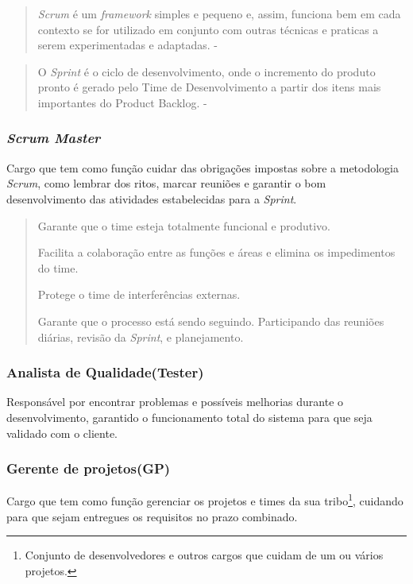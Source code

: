 \begin{quote}
  \textit{Scrum} é um \textit{framework} simples e pequeno e, assim, funciona bem em  cada contexto se for utilizado em conjunto com outras técnicas e praticas a serem experimentadas e adaptadas. - \cite{sabbagh2014scrum}
\end{quote}
\begin{quote}
  O \textit{Sprint} é o ciclo de desenvolvimento, onde o incremento do produto pronto é gerado pelo Time de Desenvolvimento a partir dos itens mais importantes do Product Backlog. - \cite{sabbagh2014scrum}
\end{quote}


\subsubsection{\textit{Scrum Master}}

Cargo que tem como função cuidar das obrigações impostas sobre a metodologia \textit{Scrum}, como lembrar dos ritos, marcar reuniões e garantir o bom desenvolvimento das atividades estabelecidas para a \textit{Sprint}.

\begin{quote}
Garante que o time esteja
totalmente funcional e
produtivo.

Facilita a colaboração entre as
funções e áreas e elimina os
impedimentos do time.

Protege o time de
interferências externas.

Garante que o processo está
sendo seguindo. Participando
das reuniões diárias, revisão
da \textit{Sprint}, e planejamento. \cite{sabbagh2014scrum}

\end{quote}

\subsubsection{Analista de Qualidade(Tester)}

Responsável por encontrar problemas e possíveis melhorias durante o desenvolvimento, garantido o funcionamento total do sistema para que seja validado com o cliente.

\subsubsection{Gerente de projetos(GP)}

Cargo que tem como função gerenciar os projetos e times da sua
 tribo\footnote{Conjunto de desenvolvedores e outros cargos que cuidam de um ou vários projetos.}, cuidando para que sejam entregues os requisitos no prazo combinado.

